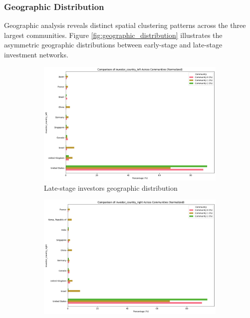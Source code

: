 
\subsubsection{Geographic Distribution}

Geographic analysis reveals distinct spatial clustering patterns across the three largest communities. Figure \ref{fig:geographic_distribution} illustrates the asymmetric geographic distributions between early-stage and late-stage investment networks.


\begin{figure}[htbp]
\centering
\begin{subfigure}{0.48\textwidth}
    \centering
    \includegraphics[width=\textwidth]{./assets/investor-left-countries.png}
    \caption{Late-stage investors geographic distribution}
    \label{fig:late_stage_geo}
\end{subfigure}
\hfill
\begin{subfigure}{0.48\textwidth}
    \centering
    \includegraphics[width=\textwidth]{./assets/investor-right-countries.png}

\end{subfigure}
\end{figure}
